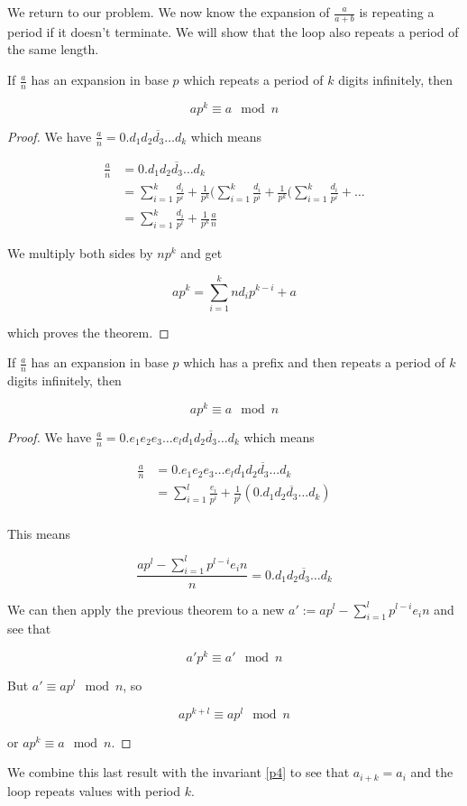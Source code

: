 We return to our problem. We now know the expansion of $\frac{a}{a+b}$ is repeating a period if it doesn't terminate. We will show that the loop also repeats a period of the same length.

\begin{thm}\label{while_a_decimal_expansion_five}
If $\frac{a}{n}$ has an expansion in base $p$ which repeats a period of $k$ digits infinitely, then

$$
a p^k \equiv a \mod n
$$  
\end{thm}

\begin{proof}
We have $\frac{a}{n} = 0.\overline{d_1 d_2 d_3 \ldots d_k}$ which means

\begin{align*}
\frac{a}{n} &= 0.\overline{d_1 d_2 d_3 \ldots d_k} \\
            &= \sum_{i = 1}^k \frac{d_i}{p^i} + \frac{1}{p^k} (\sum_{i = 1}^k \frac{d_i}{p^i} + \frac{1}{p^k} (\sum_{i = 1}^k \frac{d_i}{p^i} + \ldots \\
            &= \sum_{i = 1}^k \frac{d_i}{p^i} + \frac{1}{p^k} \frac{a}{n}
\end{align*}

We multiply both sides by $n p^k$ and get

$$
a p^k = \sum_{i = 1}^k n d_i p^{k - i} + a
$$

which proves the theorem.
\end{proof}

\begin{thm}\label{while_a_decimal_expansion_six}
If $\frac{a}{n}$ has an expansion in base $p$ which has a prefix and then repeats a period of $k$ digits infinitely, then

$$
a p^k \equiv a \mod n
$$  
\end{thm}

\begin{proof}
We have $\frac{a}{n} = 0.e_1 e_2 e_3 \ldots e_l \overline{d_1 d_2 d_3 \ldots d_k}$ which means

\begin{align*}
\frac{a}{n} &= 0.e_1 e_2 e_3  \ldots e_l \overline{d_1 d_2 d_3 \ldots d_k} \\
            &= \sum_{i = 1}^l \frac{e_i}{p^i} + \frac{1}{p^l} (0.\overline{d_1 d_2 d_3 \ldots d_k}) \\
\end{align*}

This means

$$
\frac{a p^l - \sum_{i = 1}^l p^{l-i} e_i n}{n} = 0.\overline{d_1 d_2 d_3 \ldots d_k}
$$

We can then apply the previous theorem to a new $a' := a p^l - \sum_{i = 1}^l p^{l-i} e_i n$ and see that

$$
a' p^k \equiv a' \mod n
$$

But $a' \equiv a p^l \mod n$, so 

$$
a p^{k+l} \equiv a p^l \mod n
$$

or $a p^k \equiv a \mod n$. 
\end{proof}

We combine this last result with the invariant \ref{p4} to see that $a_{i + k} = a_i$ and the loop repeats values with period $k$.
